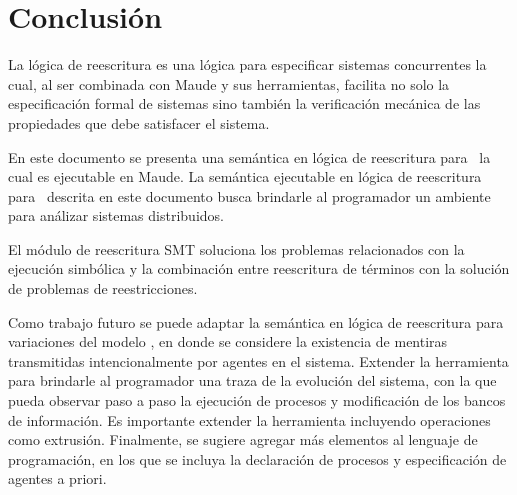
\chapter{Conclusi\'on}
\label{c.conclu}

La l\'ogica de reescritura es una l\'ogica para especificar sistemas concurrentes la cual, al ser combinada con Maude y sus herramientas, facilita no solo la especificaci\'on formal de sistemas sino tambi\'en la verificaci\'on mec\'anica de las propiedades que debe satisfacer el sistema.

En este documento se presenta una sem\'antica en l\'ogica de reescritura para \SCCP \ la cual es ejecutable en Maude. La sem\'antica ejecutable en l\'ogica de reescritura para \SCCP \ descrita en este documento busca brindarle al programador un ambiente para an\'alizar sistemas distribuidos. 

El m\'odulo de reescritura SMT soluciona los problemas relacionados con la ejecuci\'on simb\'olica y la combinaci\'on entre reescritura de t\'erminos con la soluci\'on de problemas de reestricciones.

Como trabajo futuro se puede adaptar la sem\'antica en l\'ogica de reescritura para variaciones del modelo \SCCP, en donde se considere la existencia de mentiras transmitidas intencionalmente por agentes en el sistema. Extender la herramienta para brindarle al programador una traza de la evoluci\'on del sistema, con la que pueda observar paso a paso la ejecuci\'on de procesos y modificaci\'on de los bancos de informaci\'on. Es importante extender la herramienta incluyendo operaciones como extrusi\'on. Finalmente, se sugiere agregar m\'as elementos al lenguaje de programaci\'on, en los que se incluya la declaraci\'on de procesos y especificaci\'on de agentes a priori. 